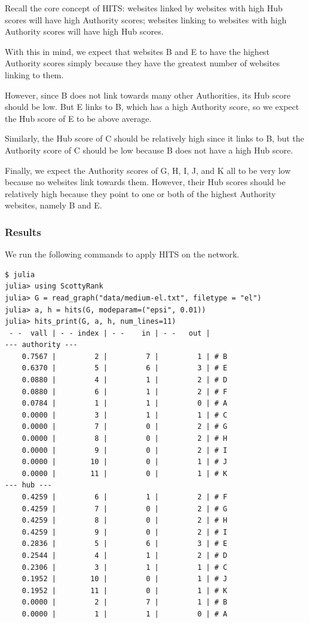 \documentclass[12pt, titlepage, twoside]{amsart}
\begin{document}
Recall the core concept of HITS:
websites linked by websites with high Hub scores will have high Authority scores;
websites linking to websites with high Authority scores will have high Hub scores.

With this in mind, we expect that websites B and E to have the highest Authority scores
simply because they have the greatest number of websites linking to them.

However, since B does not link towards many other Authorities, its Hub score should be low.
But E links to B, which has a high Authority score, so we expect the Hub score of E to be above average.

Similarly, the Hub score of C should be relatively high since it links to B, but the Authority score of
C should be low because B does not have a high Hub score.

Finally, we expect the Authority scores of G, H, I, J, and K all to be very low
because no websites link towards them.
However, their Hub scores should be relatively high because they point to
one or both of the highest Authority websites, namely B and E.

\subsubsection{Results}

We run the following commands to apply HITS on the network.

\begin{verbatim}
$ julia
julia> using ScottyRank
julia> G = read_graph("data/medium-el.txt", filetype = "el")
julia> a, h = hits(G, modeparam=("epsi", 0.01))
julia> hits_print(G, a, h, num_lines=11)
 - -  vall | - - index | - -    in | - -   out |
--- authority ---
    0.7567 |         2 |         7 |         1 | # B
    0.6370 |         5 |         6 |         3 | # E
    0.0880 |         4 |         1 |         2 | # D
    0.0880 |         6 |         1 |         2 | # F
    0.0784 |         1 |         1 |         0 | # A
    0.0000 |         3 |         1 |         1 | # C
    0.0000 |         7 |         0 |         2 | # G
    0.0000 |         8 |         0 |         2 | # H
    0.0000 |         9 |         0 |         2 | # I
    0.0000 |        10 |         0 |         1 | # J
    0.0000 |        11 |         0 |         1 | # K
--- hub ---
    0.4259 |         6 |         1 |         2 | # F
    0.4259 |         7 |         0 |         2 | # G
    0.4259 |         8 |         0 |         2 | # H
    0.4259 |         9 |         0 |         2 | # I
    0.2836 |         5 |         6 |         3 | # E
    0.2544 |         4 |         1 |         2 | # D
    0.2306 |         3 |         1 |         1 | # C
    0.1952 |        10 |         0 |         1 | # J
    0.1952 |        11 |         0 |         1 | # K
    0.0000 |         2 |         7 |         1 | # B
    0.0000 |         1 |         1 |         0 | # A
\end{verbatim}
\end{document}
